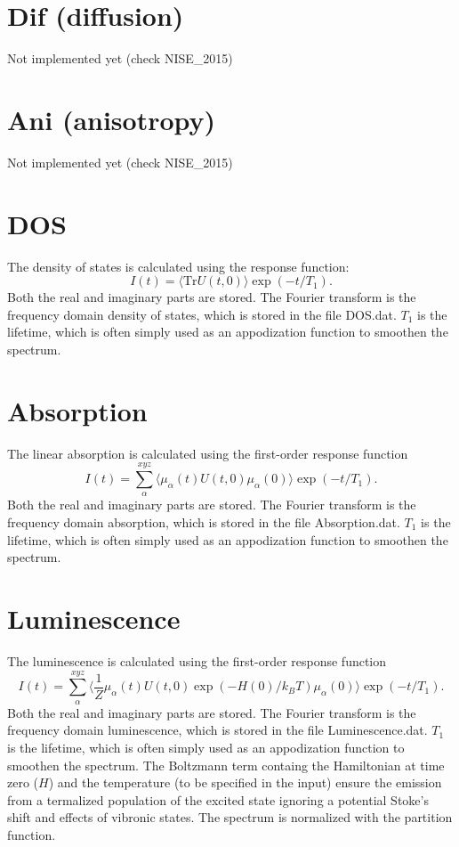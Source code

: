 \section{Dif (diffusion)}
Not implemented yet (check NISE\_2015)
\section{Ani (anisotropy)}
Not implemented yet (check NISE\_2015)
\section{DOS}
The density of states is calculated using the response function:
\begin{equation}
	I(t)=\langle\textrm{Tr}U(t,0)\rangle\exp(-t/T_1).
\end{equation}
Both the real and imaginary parts are stored. The Fourier transform is the frequency domain density of states, which is stored in the file DOS.dat. $T_1$ is the lifetime, which is often simply used as an appodization function to smoothen the spectrum.
\section{Absorption}
The linear absorption is calculated using the first-order response function
\begin{equation}
	I(t)=\sum_{\alpha}^{xyz}\langle\mu_{\alpha}(t)U(t,0)\mu_{\alpha}(0)\rangle\exp(-t/T_1).
\end{equation}
Both the real and imaginary parts are stored. The Fourier transform is the frequency domain absorption, which is stored in the file Absorption.dat. $T_1$ is the lifetime, which is often simply used as an appodization function to smoothen the spectrum. 
\section{Luminescence}
The luminescence is calculated using the first-order response function
\begin{equation}
	I(t)=\sum_{\alpha}^{xyz}\langle\frac{1}{Z}\mu_{\alpha}(t)U(t,0)\exp(-H(0)/k_BT)\mu_{\alpha}(0)\rangle\exp(-t/T_1).
\end{equation}
Both the real and imaginary parts are stored. The Fourier transform is the frequency domain luminescence, which is stored in the file Luminescence.dat. $T_1$ is the lifetime, which is often simply used as an appodization function to smoothen the spectrum. The Boltzmann term containg the Hamiltonian at time zero ($H$) and the temperature (to be specified in the input) ensure the emission from a termalized population of the excited state ignoring a potential Stoke's shift and effects of vibronic states. The spectrum is normalized with the partition function. 
